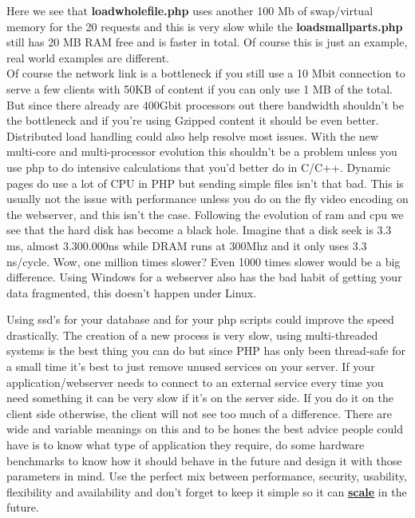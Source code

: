Here we see that \textbf{loadwholefile.php} uses another 100 Mb of swap/virtual memory for the 20 requests and this is very slow while the \textbf{loadsmallparts.php} still has 20 MB RAM free and is faster in total.
Of course this is just an example, real world examples are different.
\\
Of course the network link is a bottleneck if you still use a 10 Mbit connection to serve a few clients with 50KB of content if you can only use 1 MB of the total. But since there already are 400Gbit processors out there\cite{400g_network_processor}  bandwidth shouldn't be the bottleneck and if you're using Gzipped content it should be even better. Distributed load handling could also help resolve most issues.
With the new multi-core and multi-processor evolution this shouldn't be a problem unless you use \gls{php} to do intensive calculations that you'd better do in C/C++. Dynamic pages do use a lot of CPU in PHP but sending simple files isn't that bad. This is usually not the issue with performance unless you do on the fly video encoding on the webserver, and this isn't the case.
Following the evolution of \gls{ram} and \gls{cpu} we see that the hard disk has become a black hole. Imagine that a disk seek is 3.3 ms, almost 3.300.000ns while DRAM runs at 300Mhz and it only uses 3.3 ns/cycle. Wow, one million times slower? Even 1000 times slower would be a big difference. Using Windows for a webserver also has the bad habit of getting your data fragmented, this doesn't happen under Linux.

Using \gls{ssd}'s for your database and for your \gls{php} scripts could improve the speed drastically.
The creation of a new process is very slow, using multi-threaded systems is the best thing you can do but since PHP has only been thread-safe for a small time it's best to just remove unused services on your server.
If your application/webserver needs to connect to an external service every time you need something it can be very slow if it's on the server side. If you do it on the client side otherwise, the client will not see too much of a difference.
There are wide and variable meanings on this and to be hones the best advice people could have is to know what type of application they require, do some hardware benchmarks to know how it should behave in the future and design it with those parameters in mind. Use the perfect mix between performance, security, usability, flexibility and availability and don't forget to keep it simple so it can \textbf{\underline{scale}} in the future.
